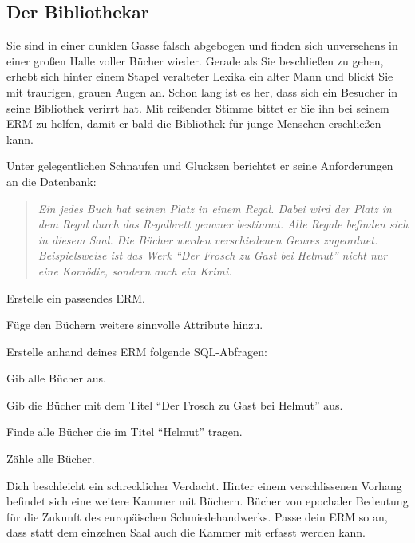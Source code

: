 \documentclass[11pt, a4paper, ngerman]{arbeitsblatt}
\begin{document}
\begin{aufgabe}
\newpage

\begin{rahmen}\vspace*{-1em}
	\subsection*{Der Bibliothekar}

	Sie sind in einer dunklen Gasse falsch abgebogen und finden sich unversehens in einer
	großen Halle voller Bücher wieder. Gerade als Sie beschließen zu gehen, erhebt sich
	hinter einem Stapel veralteter Lexika ein alter Mann und blickt Sie mit traurigen,
	grauen Augen an. Schon lang ist es her, dass sich ein Besucher in seine Bibliothek
	verirrt hat. Mit reißender Stimme bittet er Sie ihn bei seinem ERM zu helfen, damit
	er bald die Bibliothek für junge Menschen erschließen kann.

	Unter gelegentlichen Schnaufen und Glucksen berichtet er seine Anforderungen an die Datenbank:

	\begin{quote}\itshape
		Ein jedes Buch hat seinen Platz in einem Regal. Dabei wird der Platz in dem Regal durch
		das Regalbrett genauer bestimmt. Alle Regale befinden sich in diesem Saal. Die Bücher
		werden verschiedenen Genres zugeordnet. Beispielsweise ist das Werk \enquote{Der Frosch
		zu Gast bei Helmut} nicht nur eine Komödie, sondern auch ein Krimi.
	\end{quote}

	\begin{enuma}[noitemsep]
		\item Erstelle ein passendes ERM.
		\item Füge den Büchern weitere sinnvolle Attribute hinzu.
		\item Erstelle anhand deines ERM folgende SQL-Abfragen:
		\begin{smallenum}
			\item Gib alle Bücher aus.
			\item Gib die Bücher mit dem Titel \enquote{Der Frosch zu Gast bei Helmut} aus.
			\item Finde alle Bücher die im Titel \enquote{Helmut} tragen.
			\item Zähle alle Bücher.
		\end{smallenum}
		\smallskip
		\item Dich beschleicht ein schrecklicher Verdacht. Hinter einem verschlissenen Vorhang
		befindet sich eine weitere Kammer mit Büchern. Bücher von epochaler Bedeutung für die
		Zukunft des europäischen Schmiedehandwerks. Passe dein ERM so an, dass statt dem einzelnen
		Saal auch die Kammer mit erfasst werden kann.
	\end{enuma}
	\end{rahmen}
\end{aufgabe}
\end{document}
